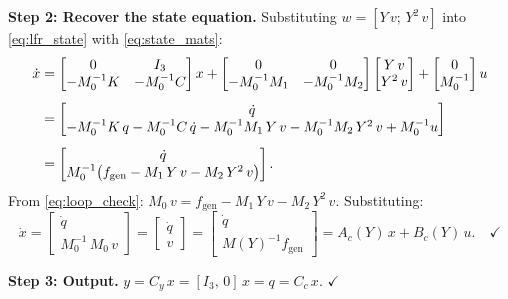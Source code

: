 \documentclass[11pt]{article}
\begin{document}
\medskip
\noindent\textbf{Step 2: Recover the state equation.}
Substituting $w = [Y\,v;\,Y^2\,v]$ into \eqref{eq:lfr_state} with \eqref{eq:state_mats}:
\begin{align}
    \dot{x} &= \begin{bmatrix} 0 & I_3 \\ -M_0^{-1}K & -M_0^{-1}C \end{bmatrix} x
              + \begin{bmatrix} 0 & 0 \\ -M_0^{-1}M_1 & -M_0^{-1}M_2 \end{bmatrix}
                \begin{bmatrix} Y\,v \\ Y^2\,v \end{bmatrix}
              + \begin{bmatrix} 0 \\ M_0^{-1} \end{bmatrix} u \notag\\[4pt]
    &= \begin{bmatrix} \dot{q} \\
         -M_0^{-1}K\,q - M_0^{-1}C\,\dot{q}
         - M_0^{-1}M_1\,Y\,v - M_0^{-1}M_2\,Y^2\,v
         + M_0^{-1}u \end{bmatrix} \notag\\[4pt]
    &= \begin{bmatrix} \dot{q} \\
         M_0^{-1}\bigl(f_\mathrm{gen} - M_1\,Y\,v - M_2\,Y^2\,v\bigr) \end{bmatrix}.
    \label{eq:xdot_expand}
\end{align}
From \eqref{eq:loop_check}: $M_0\,v = f_\mathrm{gen} - M_1\,Y\,v - M_2\,Y^2\,v$.
Substituting:
\begin{equation}
    \dot{x} = \begin{bmatrix} \dot{q} \\ M_0^{-1}\,M_0\,v \end{bmatrix}
            = \begin{bmatrix} \dot{q} \\ v \end{bmatrix}
            = \begin{bmatrix} \dot{q} \\ M(Y)^{-1}f_\mathrm{gen} \end{bmatrix}
            = A_c(Y)\,x + B_c(Y)\,u. \quad \checkmark
    \label{eq:verify_ok}
\end{equation}

\medskip
\noindent\textbf{Step 3: Output.}
$y = C_y\,x = [I_3,\,0]\,x = q = C_c\,x$. \quad $\checkmark$
\end{document}
